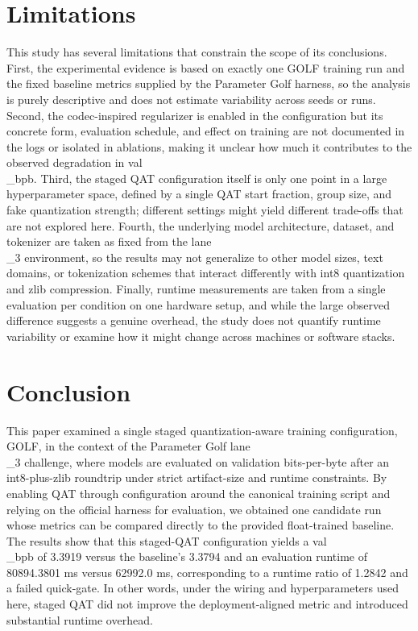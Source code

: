 \documentclass{article}
\begin{document}
\section{Limitations}

\label{sec:limitations}

This study has several limitations that constrain the scope of its conclusions. First, the experimental evidence is based on exactly one GOLF training run and the fixed baseline metrics supplied by the Parameter Golf harness, so the analysis is purely descriptive and does not estimate variability across seeds or runs. Second, the codec-inspired regularizer is enabled in the configuration but its concrete form, evaluation schedule, and effect on training are not documented in the logs or isolated in ablations, making it unclear how much it contributes to the observed degradation in val\\_bpb. Third, the staged QAT configuration itself is only one point in a large hyperparameter space, defined by a single QAT start fraction, group size, and fake quantization strength; different settings might yield different trade-offs that are not explored here. Fourth, the underlying model architecture, dataset, and tokenizer are taken as fixed from the lane\\_3 environment, so the results may not generalize to other model sizes, text domains, or tokenization schemes that interact differently with int8 quantization and zlib compression. Finally, runtime measurements are taken from a single evaluation per condition on one hardware setup, and while the large observed difference suggests a genuine overhead, the study does not quantify runtime variability or examine how it might change across machines or software stacks.

\section{Conclusion}

\label{sec:conclusion}

This paper examined a single staged quantization-aware training configuration, GOLF, in the context of the Parameter Golf lane\\_3 challenge, where models are evaluated on validation bits-per-byte after an int8-plus-zlib roundtrip under strict artifact-size and runtime constraints. By enabling QAT through configuration around the canonical training script and relying on the official harness for evaluation, we obtained one candidate run whose metrics can be compared directly to the provided float-trained baseline. The results show that this staged-QAT configuration yields a val\\_bpb of 3.3919 versus the baseline's 3.3794 and an evaluation runtime of 80894.3801 ms versus 62992.0 ms, corresponding to a runtime ratio of 1.2842 and a failed quick-gate. In other words, under the wiring and hyperparameters used here, staged QAT did not improve the deployment-aligned metric and introduced substantial runtime overhead.
\end{document}
